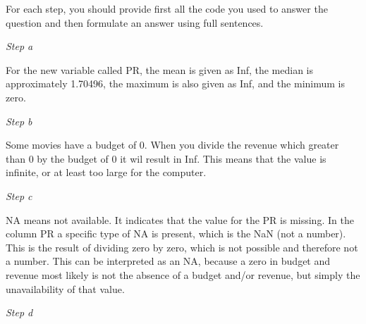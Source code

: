 \documentclass[
]{article}
\newenvironment{Shaded}{\begin{snugshade}}{\end{snugshade}}
\newcommand{\AttributeTok}[1]{\textcolor[rgb]{0.13,0.29,0.53}{#1}}
\newcommand{\CommentTok}[1]{\textcolor[rgb]{0.56,0.35,0.01}{\textit{#1}}}
\newcommand{\ConstantTok}[1]{\textcolor[rgb]{0.56,0.35,0.01}{#1}}
\newcommand{\FunctionTok}[1]{\textcolor[rgb]{0.13,0.29,0.53}{\textbf{#1}}}
\newcommand{\NormalTok}[1]{#1}
\newcommand{\OtherTok}[1]{\textcolor[rgb]{0.56,0.35,0.01}{#1}}
\newcommand{\SpecialCharTok}[1]{\textcolor[rgb]{0.81,0.36,0.00}{\textbf{#1}}}
\begin{document}
For each step, you should provide first all the code you used to answer
the question and then formulate an answer using full sentences.

\emph{Step a}

\begin{Shaded}
\end{Shaded}

For the new variable called PR, the mean is given as Inf, the median is
approximately 1.70496, the maximum is also given as Inf, and the minimum
is zero.

\emph{Step b}

Some movies have a budget of 0. When you divide the revenue which
greater than 0 by the budget of 0 it wil result in Inf. This means that
the value is infinite, or at least too large for the computer.

\emph{Step c}

NA means not available. It indicates that the value for the PR is
missing. In the column PR a specific type of NA is present, which is the
NaN (not a number). This is the result of dividing zero by zero, which
is not possible and therefore not a number. This can be interpreted as
an NA, because a zero in budget and revenue most likely is not the
absence of a budget and/or revenue, but simply the unavailability of
that value.

\emph{Step d}
\end{document}
